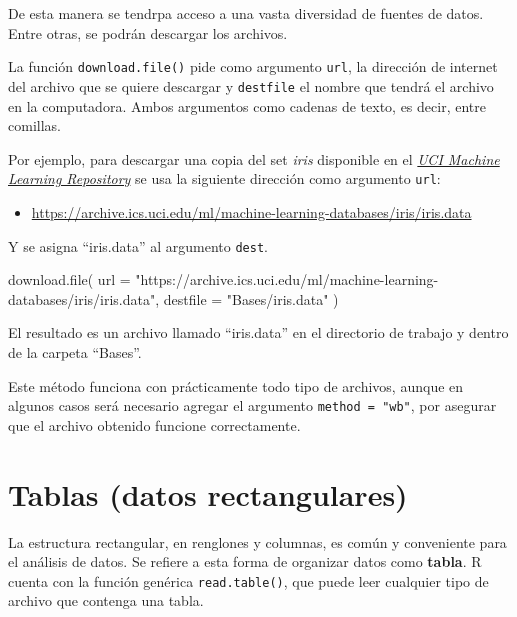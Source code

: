 \documentclass[
]{book}
\newenvironment{Shaded}{\begin{snugshade}}{\end{snugshade}}
\newcommand{\AttributeTok}[1]{\textcolor[rgb]{0.77,0.63,0.00}{#1}}
\newcommand{\FunctionTok}[1]{\textcolor[rgb]{0.00,0.00,0.00}{#1}}
\newcommand{\NormalTok}[1]{#1}
\newcommand{\StringTok}[1]{\textcolor[rgb]{0.31,0.60,0.02}{#1}}
\providecommand{\tightlist}{%
  \setlength{\itemsep}{0pt}\setlength{\parskip}{0pt}}
\begin{document}
De esta manera se tendrpa acceso a una vasta diversidad de fuentes de datos. Entre otras, se podrán descargar los archivos.

La función \texttt{download.file()} pide como argumento \texttt{url}, la dirección de internet del archivo que se quiere descargar y \texttt{destfile} el nombre que tendrá el archivo en la computadora. Ambos argumentos como cadenas de texto, es decir, entre comillas.

Por ejemplo, para descargar una copia del set \emph{iris} disponible en el \href{https://archive.ics.uci.edu}{\emph{UCI Machine Learning Repository}} se usa la siguiente dirección como argumento \texttt{url}:

\begin{itemize}
\tightlist
\item
  \url{https://archive.ics.uci.edu/ml/machine-learning-databases/iris/iris.data}
\end{itemize}

Y se asigna ``iris.data'' al argumento \texttt{dest}.

\begin{Shaded}
\begin{Highlighting}[]
\FunctionTok{download.file}\NormalTok{(}
  \AttributeTok{url =} \StringTok{"https://archive.ics.uci.edu/ml/machine{-}learning{-}databases/iris/iris.data"}\NormalTok{, }
  \AttributeTok{destfile =} \StringTok{"Bases/iris.data"}
\NormalTok{  )}
\end{Highlighting}
\end{Shaded}

El resultado es un archivo llamado ``iris.data'' en el directorio de trabajo y dentro de la carpeta ``Bases''.

Este método funciona con prácticamente todo tipo de archivos, aunque en algunos casos será necesario agregar el argumento \texttt{method\ =\ "wb"}, por asegurar que el archivo obtenido funcione correctamente.

\hypertarget{tablas-datos-rectangulares}{%
\section{Tablas (datos rectangulares)}\label{tablas-datos-rectangulares}}

La estructura rectangular, en renglones y columnas, es común y conveniente para el análisis de datos. Se refiere a esta forma de organizar datos como \textbf{tabla}. R cuenta con la función genérica \texttt{read.table()}, que puede leer cualquier tipo de archivo que contenga una tabla.
\end{document}
